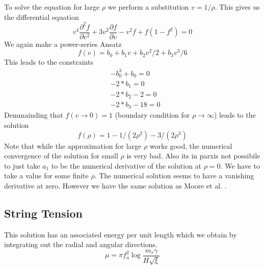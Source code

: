 \documentclass[a4paper]{article}
\begin{document}
To solve the equation for large $\rho$ we perform a substitution $v = 1 / \rho$.
This gives us the differential equation
\begin{equation}
	v^4 \frac{\partial^2 f}{\partial v^2} + 3 v^2 \frac{\partial f}{\partial v} - v^2 f + f (1 - f^2) = 0
\end{equation}
We again make a power-series Ansatz 
\begin{equation}
	f(v) =  b_0 + b_1v + b_2 v^2/2 + b_3 v^3/6
\end{equation}
This leads to the constraints 
\begin{align}
&-b_0^3 + b_0 = 0\\
&-2*b_1 = 0\\
&-2*b_2 - 2 = 0\\
&-2*b_3 - 18 = 0
\end{align}
Demmainding that $f(v \to 0) = 1$ (boundary condition for $\rho \to \infty$) leads to the solution
\begin{equation}
	 f(\rho) = 1 - 1/(2\rho^2) - 3/(2\rho^3)
\end{equation} 
Note that while the approximation for large $\rho$ works good, the numerical convergence of the solution for small $\rho$ is very bad. Also its in parxis not possibile to just take $a_1$ to be the numerical derivative of the solution at $\rho = 0$. We have to take a value for some finite $\rho$. The numerical solution seems to have a vanishing derivative at zero. However we have the same solution as Moore et al. \cite[eq. A.6]{Axion2D_Fleury:2016xrz}.

\subsection{String Tension}
This solution has an associated energy per unit length which we obtain by integrating out the radial and angular directions.
\begin{equation}
	\mu = \pi f_a^2 \log \frac{m_r \gamma}{H \sqrt{\xi}}
\end{equation}
\end{document}
